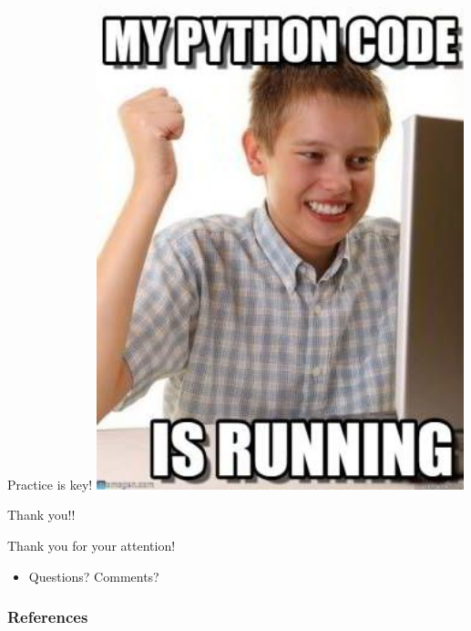 \documentclass[handout]{beamer}
\begin{document}
\begin{frame}{Practice is key!}
    \centering
    \includegraphics[width=0.8\textwidth,height=0.8\textheight,keepaspectratio]{python_running.jpeg}
\end{frame}


\begin{frame}{Thank you!!}
	\begin{block}{Thank you for your attention!}
		\begin{itemize}
			\item Questions? Comments?
		\end{itemize}
	\end{block}
\end{frame}

\begin{frame}[t,allowframebreaks]
	\frametitle{References}
	\printbibliography
\end{frame}
\end{document}
